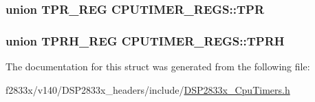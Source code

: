 \subsubsection[{T\+P\+R}]{\setlength{\rightskip}{0pt plus 5cm}union {\bf T\+P\+R\+\_\+\+R\+E\+G} C\+P\+U\+T\+I\+M\+E\+R\+\_\+\+R\+E\+G\+S\+::\+T\+P\+R}\label{struct_c_p_u_t_i_m_e_r___r_e_g_s_a82cb3c7bbf6bcc09fdafb05447f27756}
\hypertarget{struct_c_p_u_t_i_m_e_r___r_e_g_s_a8dfdba9cf05c9f01e5c8e2dcf6e9cb97}{}
\subsubsection[{T\+P\+R\+H}]{\setlength{\rightskip}{0pt plus 5cm}union {\bf T\+P\+R\+H\+\_\+\+R\+E\+G} C\+P\+U\+T\+I\+M\+E\+R\+\_\+\+R\+E\+G\+S\+::\+T\+P\+R\+H}\label{struct_c_p_u_t_i_m_e_r___r_e_g_s_a8dfdba9cf05c9f01e5c8e2dcf6e9cb97}


The documentation for this struct was generated from the following file\+:\begin{DoxyCompactItemize}
\item 
f2833x/v140/\+D\+S\+P2833x\+\_\+headers/include/\hyperlink{_d_s_p2833x___cpu_timers_8h}{D\+S\+P2833x\+\_\+\+Cpu\+Timers.\+h}\end{DoxyCompactItemize}
